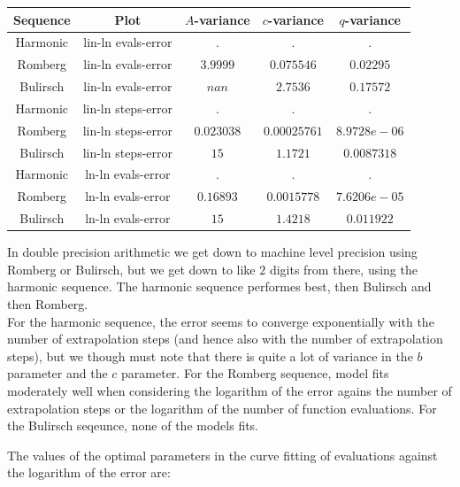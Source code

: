 \begin{table}[H]
    \centering
    \begin{tabular}{c|c||c|c|c}
Sequence & Plot & \(A\)-variance & \(c\)-variance & \(q\)-variance\\\hline
Harmonic & lin-ln evals-error & . & . & . \\
Romberg & lin-ln evals-error & \(3.9999\) & \(0.075546\) & \(0.02295\) \\
Bulirsch & lin-ln evals-error & \(nan\) & \(2.7536\) & \(0.17572\) \\
Harmonic & lin-ln steps-error & . & . & . \\
Romberg & lin-ln steps-error & \(0.023038\) & \(0.00025761\) & \(8.9728e-06\) \\
Bulirsch & lin-ln steps-error & \(15\) & \(1.1721\) & \(0.0087318\) \\
Harmonic & ln-ln evals-error & . & . & . \\
Romberg & ln-ln evals-error & \(0.16893\) & \(0.0015778\) & \(7.6206e-05\) \\
Bulirsch & ln-ln evals-error & \(15\) & \(1.4218\) & \(0.011922\) \\
    \end{tabular}
    \label{tab:my_label}
\end{table}

In double precision arithmetic we get down to machine level precision using Romberg or Bulirsch, but we get down to like \(2\) digits from there, using the harmonic sequence. The harmonic sequence performes best, then Bulirsch and then Romberg.\\

For the harmonic sequence, the error seems to converge exponentially with the number of extrapolation steps (and hence also with the number of extrapolation steps), but we though must note that there is quite a lot of variance in the \(b\) parameter and the \(c\) parameter. For the Romberg sequence, model fits moderately well when considering the logarithm of the error agains the number of extrapolation steps or the logarithm of the number of function evaluations. For the Bulirsch seqeunce, none of the models fits.

The values of the optimal parameters in the curve fitting of evaluations against the logarithm of the error are:

